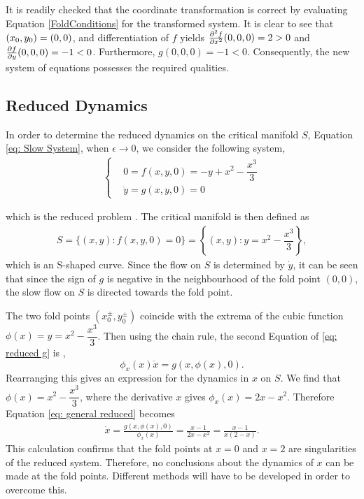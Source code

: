 It is readily checked that the coordinate transformation is correct by evaluating Equation \ref{FoldConditions} for the transformed system. It is clear to see that $(x_0,y_0)=(0,0)$, and differentiation of $f$ yields $\pd[2]{f}{x}(0,0,0)=2>0$ and $\pd{f}{y}(0,0,0)=-1<0$. Furthermore, $g(0,0,0) = -1 <0$. Consequently, the new system of equations possesses the required qualities.

\subsection{Reduced Dynamics}

In order to determine the reduced dynamics on the critical manifold $S$, Equation \ref{eq: Slow System}, when $\epsilon\to 0$, we consider the following system,
\begin{align}
\begin{cases}
&0=f(x,y,0)=-y+x^2-\dfrac{x^3}{3}\\
&\dot{y}=g(x,y,0)=0 \label{eq: reduced g}
\end{cases}
\end{align}

which is the reduced problem \citep{Kuehn}. 
The critical manifold is then defined as 
\begin{align}
S= \{ (x,y) : f(x,y,0)=0 \} = \left\{ (x,y) : y = x^2-\dfrac{x^3}{3}\right \},
\end{align}
which is an S-shaped curve. 
Since the flow on $S$ is determined by $\dot{y}$, it can be seen that since the sign of $g$ is negative in the neighbourhood of the fold point $(0,0)$, the slow flow on $S$ is directed towards the fold point.

The two  fold points $(x_0^\pm,y_0^\pm)$ coincide with the extrema of the cubic function  $ \phi(x) = y = x^2-\dfrac{x^3}{3}$.
Then using the chain rule, the second Equation of \ref{eq: reduced g} is  \citep{krupa2001},
\begin{equation}
\phi_x(x)\dot{x}=g(x,\phi(x),0).
\label{eq: general reduced}
\end{equation}
Rearranging this gives an expression for the dynamics in $x$ on $S$.
We find that $\phi(x)=x^2-\dfrac{x^3}{3}$, where the derivative \wrt $x$ gives $\phi_x(x)=2x-x^2$.
Therefore Equation \ref{eq: general reduced} becomes 
\begin{align*}
\dot{x} = \frac{g(x,\phi(x),0)}{ \phi_x(x)} = \frac{ x-1}{2x-x^2} =\frac{ x-1}{x(2-x)}.
\end{align*}
This calculation confirms that the fold points at $x=0$ and $x=2$ are singularities of the reduced system. Therefore, no conclusions about the dynamics of $x$ can be made at the fold points. Different methods will have to be developed in order to overcome this.

